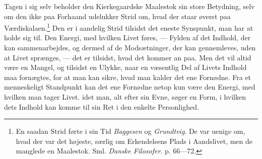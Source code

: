 \documentclass[12pt]{article}
\begin{document}
Tagen i sig selv beholder den Kierkegaardske Maalestok sin store
Betydning, selv om den ikke paa Forhaand udelukker Strid om, hvad der
staar øverst paa Værdiskalaen.\footnote{En saadan Strid førte i sin Tid
\emph{Baggesen} og \emph{Grundtvig}. De var uenige om, hvad der var det
højeste, særlig om Erkendelsens Plads i Aandslivet, men de manglede en
Maalestok. Sml. \textit{Danske Filosofer}. p. 66---72.} Den er i
aandelig Strid tilsidst det eneste Synspunkt, man har at holde sig til.
Den Energi, med hvilken Livet føres, --- Fylden af det Indhold, der kan
sammenarbejdes, og dermed af de Modsætninger, der kan gennemleves, uden
at Livet sprænges, --- det er tilsidst, hvad det kommer an paa. Men det
vil altid være en Mangel, og tilsidst en Ulykke, naar en væsentlig Del
af Livets Indhold maa fornægtes, for at man kan sikre, hvad man kalder
det ene Fornødne. Fra et menneskeligt Standpunkt kan det ene Fornødne
netop kun være den Energi, med hvilken man tager
Livet. idet man, alt efter sin Evne, søger en Form, i hvilken dets
Indhold kan komme til sin Ret i den enkelte Personlighed.
\end{document}
